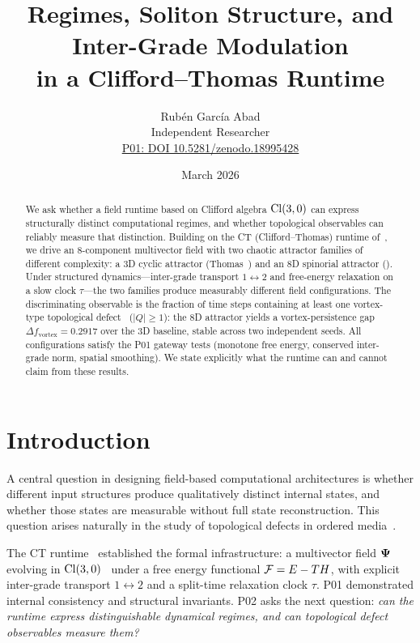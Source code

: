 \documentclass[11pt,a4paper]{article}
\title{\textbf{Regimes, Soliton Structure, and Inter-Grade Modulation\\
in a Clifford--Thomas Runtime}}
\author{
  Rubén García Abad\\
  Independent Researcher\\
  \href{https://doi.org/10.5281/zenodo.18995428}{P01: DOI 10.5281/zenodo.18995428}
}
\date{March 2026}
\begin{document}
\maketitle

\begin{abstract}
We ask whether a field runtime based on Clifford algebra $\mathrm{Cl}(3,0)$
can express structurally distinct computational regimes, and whether
topological observables can reliably measure that distinction.
Building on the CT (Clifford--Thomas) runtime of~\cite{zenodo_p01},
we drive an 8-component multivector field with two chaotic attractor
families of different complexity: a 3D cyclic attractor (Thomas~\cite{thomas1999})
and an 8D spinorial attractor (\cite{zenodo_p00}).
Under structured dynamics---inter-grade transport $1\leftrightarrow 2$
and free-energy relaxation on a slow clock $\tau$---the two families
produce measurably different field configurations.
The discriminating observable is the fraction of time steps containing
at least one vortex-type topological defect~\cite{mermin1979}
($|Q|\geq 1$): the 8D attractor yields a vortex-persistence gap
$\Delta f_{\mathrm{vortex}} = 0.2917$ over the 3D baseline,
stable across two independent seeds.
All configurations satisfy the P01 gateway tests (monotone free energy,
conserved inter-grade norm, spatial smoothing).
We state explicitly what the runtime can and cannot claim from these results.
\end{abstract}

\section{Introduction}

A central question in designing field-based computational architectures
is whether different input structures produce qualitatively distinct
internal states, and whether those states are measurable without full
state reconstruction.
This question arises naturally in the study of topological defects
in ordered media~\cite{mermin1979}.

The CT runtime~\cite{zenodo_p01} established the formal infrastructure:
a multivector field $\boldsymbol{\Psi}$ evolving in $\mathrm{Cl}(3,0)$~\cite{lounesto2001}
under a free energy functional $\mathcal{F} = E - TH$,
with explicit inter-grade transport $1\leftrightarrow2$ and a split-time
relaxation clock $\tau$.
P01 demonstrated internal consistency and structural invariants.
P02 asks the next question: \emph{can the runtime express distinguishable
dynamical regimes, and can topological defect observables measure them?}
\end{document}
